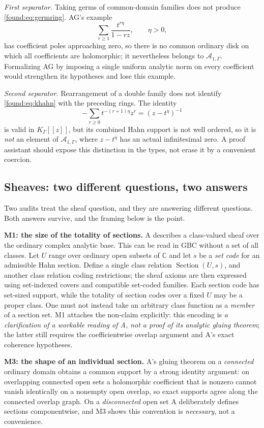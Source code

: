 \documentclass[11pt,letterpaper]{article}
\numberwithin{equation}{section}
\theoremstyle{definition}
\theoremstyle{remark}
\newcommand{\C}{\mathbb C}
\newcommand{\Ag}{\mathscr A}
\begin{document}
\emph{First separator.} Taking germs of common-domain families does not produce
\eqref{found:eq:germring}. AG's example
\[
 \sum_{r\ge1}\frac{t^{r\eta}}{1-rz},\qquad\eta>0,
\]
has coefficient poles approaching zero, so there is no common ordinary disk on
which all coefficients are holomorphic; it nevertheless belongs to
$\Ag_{1,\Gamma}$. Formalizing AG by imposing a single uniform analytic norm on
every coefficient would strengthen its hypotheses and lose this example.

\emph{Second separator.} Rearrangement of a double family does not identify
\eqref{found:eq:khahn} with the preceding rings. The identity
\[
 -\sum_{r\ge0}t^{-(r+1)\eta}z^r=(z-t^\eta)^{-1}
\]
is valid in $K_\Gamma[[z]]$, but its combined Hahn support is not well ordered,
so it is \emph{not} an element of $\Ag_{1,\Gamma}$, where $z-t^\eta$ has an
actual infinitesimal zero. A proof assistant should expose this distinction in
the types, not erase it by a convenient coercion.

\subsection{Sheaves: two different questions, two answers}
\label{found:sub:sheaves}
Two audits treat the sheaf question, and they are answering different questions.
Both answers survive, and the framing below is the point.

\medskip\noindent
\textbf{M1: the size of the totality of sections.} A describes a class-valued
sheaf over the ordinary complex analytic base. This can be read in GBC without a
set of all classes. Let $U$ range over ordinary open subsets of $\C$ and let
$s$ be a \emph{set code} for an admissible Hahn section. Define a single class
relation $\operatorname{Section}(U,s)$, and another class relation coding
restrictions; the sheaf axioms are then expressed using set-indexed covers and
compatible set-coded families. Each section code has set-sized support, while
the totality of section codes over a fixed $U$ may be a proper class. One must
not instead take an arbitrary class function as a \emph{member} of a section
set. M1 attaches the non-claim explicitly: this encoding is \emph{a
clarification of a workable reading of A, not a proof of its analytic gluing
theorem}; the latter still requires the coefficientwise overlap argument and A's
exact coherence hypotheses.

\medskip\noindent
\textbf{M3: the shape of an individual section.} A's gluing theorem on a
\emph{connected} ordinary domain obtains a common support by a strong identity
argument: on overlapping connected open sets a holomorphic coefficient that is
nonzero cannot vanish identically on a nonempty open overlap, so exact supports
agree along the connected overlap graph. On a \emph{disconnected} open set A
deliberately defines sections componentwise, and M3 shows this convention is
\emph{necessary}, not a convenience.
\end{document}
